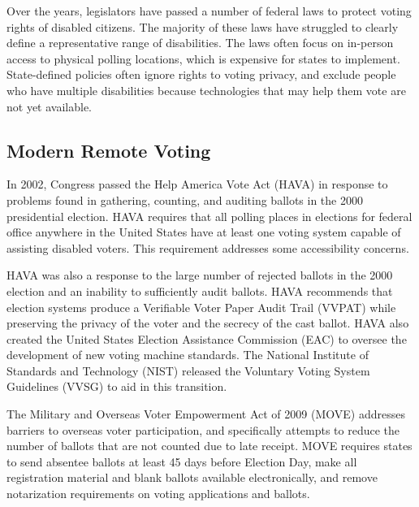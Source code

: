 Over the years, legislators have passed a number of federal laws to
protect voting rights of disabled citizens. The majority of these laws
have struggled to clearly define a representative range of
disabilities. The laws often focus on in-person access to physical
polling locations, which is expensive for states to
implement. State-defined policies often ignore rights to voting
privacy, and exclude people who have multiple disabilities because
technologies that may help them vote are not yet available.



\subsection{Modern Remote Voting}

In 2002, Congress passed the Help America Vote Act (HAVA) in response
to problems found in gathering, counting, and auditing ballots in the
2000 presidential election. HAVA requires that all polling places in
elections for federal office anywhere in the United States have at
least one voting system capable of assisting disabled voters. This
requirement addresses some accessibility concerns.

HAVA was also a response to the large number of rejected ballots in
the 2000 election and an inability to sufficiently audit ballots. HAVA
recommends that election systems produce a Verifiable Voter Paper
Audit Trail (VVPAT) while preserving the privacy of the voter and the
secrecy of the cast ballot. HAVA also created the United States
Election Assistance Commission (EAC) to oversee the development of new
voting machine standards. The National Institute of Standards and
Technology (NIST) released the Voluntary Voting System Guidelines
(VVSG) to aid in this transition.

The Military and Overseas Voter Empowerment Act of 2009 (MOVE)
addresses barriers to overseas voter participation, and specifically
attempts to reduce the number of ballots that are not counted due to
late receipt. MOVE requires states to send absentee ballots at least
45 days before Election Day, make all registration material and blank
ballots available electronically, and remove notarization requirements
on voting applications and ballots.

